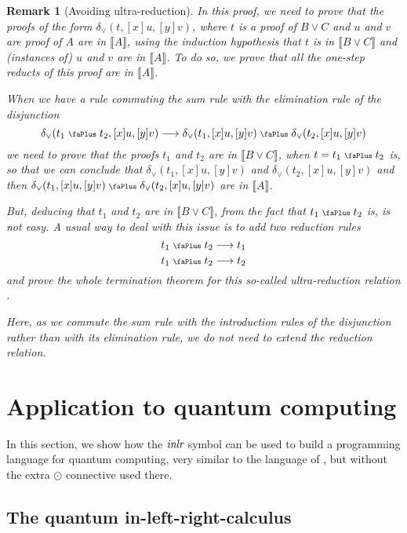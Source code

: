 \documentclass[screen, sigconf,authorversion,nonacm]{acmart}
\theoremstyle{acmdefinition}
\newtheorem{remark}[theorem]{Remark}}
\numberwithin{equation}{section}
\newcommand\abstr[1]{[#1]}
\newcommand\inlr{\mbox{\it inlr}}
\newcommand\elimor{\delta_{\vee}}
\newcommand\plus{\mathrel{\text{\normalfont\scalebox{0.7}{\faPlus}}}}
\newcommand\lra{\longrightarrow}
\begin{document}
\begin{remark}[Avoiding ultra-reduction]
In this proof, we need to prove that the proofs of the form
$\elimor(t,\abstr{x} u,\abstr{y} v)$, where $t$ is a proof of $B \vee
C$ and $u$ and $v$ are proof of $A$ are in $\llbracket A \rrbracket$,
using the induction hypothesis that $t$ is in $\llbracket B \vee C
\rrbracket$ and (instances of) $u$ and $v$ are in $\llbracket A
\rrbracket$.  To do so, we prove that all the one-step reducts of this
proof are in $\llbracket A \rrbracket$.

When we have a rule commuting the sum rule with the elimination rule
of the disjunction \cite{DiazcaroDowekTCS23,DiazcaroDowekMSCS24}
$$\elimor(t_1 \plus t_2,\abstr{x} u,\abstr{y} v) \lra
\elimor(t_1,\abstr{x} u,\abstr{y} v) \plus \elimor(t_2,\abstr{x}
u,\abstr{y} v)$$
we need to prove that the proofs $t_1$ and $t_2$ are in $\llbracket B
\vee C \rrbracket$, when $t = t_1 \plus t_2$ is, so that we can
conclude that $\elimor(t_1,\abstr{x} u,\abstr{y} v)$ and
$\elimor(t_2,\abstr{x} u,\abstr{y} v)$ and then $\elimor(t_1,\abstr{x}
u,\abstr{y} v) \plus \elimor(t_2,\abstr{x} u,\abstr{y} v)$ are in
$\llbracket A \rrbracket$.

But, deducing that $t_1$ and $t_2$ are in $\llbracket B \vee C
\rrbracket$, from the fact that $t_1 \plus t_2$ is, is not easy. A
usual way to deal with this issue is to add two reduction rules
$$t_1 \plus t_2 \lra t_1$$
$$t_1 \plus t_2 \lra t_2$$
and prove the whole termination theorem for this so-called {\it
ultra-reduction} relation \cite{Girard,DW,DiazcaroDowekTCS23}.

Here, as we commute the sum rule with the introduction rules of the
disjunction rather than with its elimination rule, we do not need to
extend the reduction relation.
\end{remark}

\section{Application to quantum computing}
\label{sec:quantum}

In this section, we show how the $\inlr$ symbol can be used to build a
programming language for quantum computing, very similar to the
language of \cite{DiazcaroDowekTCS23,DiazcaroDowekMSCS24}, but without
the extra $\odot$ connective used there.

\subsection{The quantum in-left-right-calculus}
\end{document}
